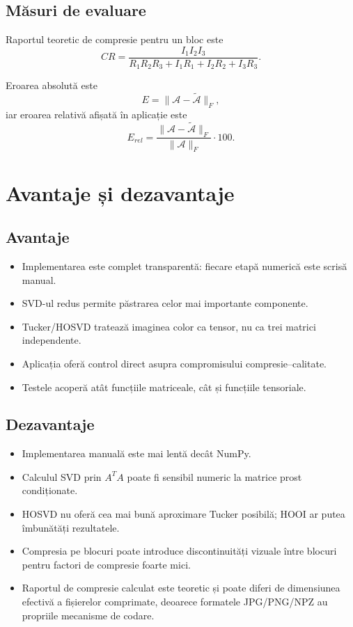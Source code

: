 \documentclass[12pt,a4paper]{article}
\theoremstyle{definition}
\begin{document}
\subsection{Măsuri de evaluare}

Raportul teoretic de compresie pentru un bloc este
\[
  CR =
  \frac{I_1I_2I_3}
  {R_1R_2R_3 + I_1R_1 + I_2R_2 + I_3R_3}.
\]

Eroarea absolută este
\[
  E = \|\mathcal{A}-\tilde{\mathcal{A}}\|_F,
\]
iar eroarea relativă afișată în aplicație este
\[
  E_{rel} =
  \frac{\|\mathcal{A}-\tilde{\mathcal{A}}\|_F}
  {\|\mathcal{A}\|_F}\cdot 100.
\]

\section{Avantaje și dezavantaje}

\subsection{Avantaje}

\begin{itemize}
  \item Implementarea este complet transparentă: fiecare etapă numerică este scrisă manual.
  \item SVD-ul redus permite păstrarea celor mai importante componente.
  \item Tucker/HOSVD tratează imaginea color ca tensor, nu ca trei matrici independente.
  \item Aplicația oferă control direct asupra compromisului compresie--calitate.
  \item Testele acoperă atât funcțiile matriceale, cât și funcțiile tensoriale.
\end{itemize}

\subsection{Dezavantaje}

\begin{itemize}
  \item Implementarea manuală este mai lentă decât NumPy.
  \item Calculul SVD prin $A^TA$ poate fi sensibil numeric la matrice prost condiționate.
  \item HOSVD nu oferă cea mai bună aproximare Tucker posibilă; HOOI ar putea îmbunătăți rezultatele.
  \item Compresia pe blocuri poate introduce discontinuități vizuale între blocuri pentru factori de compresie foarte mici.
  \item Raportul de compresie calculat este teoretic și poate diferi de dimensiunea efectivă a fișierelor comprimate, deoarece formatele JPG/PNG/NPZ au propriile mecanisme de codare.
\end{itemize}
\end{document}
